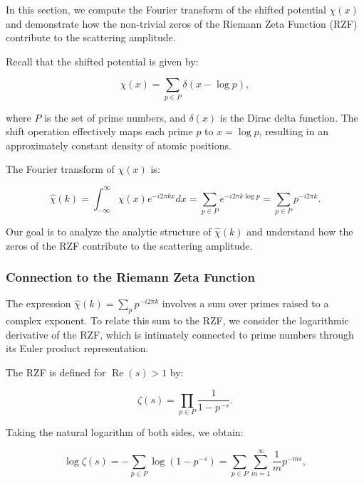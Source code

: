 \documentclass[11pt, oneside]{article}
\begin{document}
In this section, we compute the Fourier transform of the shifted potential $\chi(x)$ and demonstrate how the non-trivial zeros of the Riemann Zeta Function (RZF) contribute to the scattering amplitude.

Recall that the shifted potential is given by:

\begin{equation}
\chi(x) = \sum_{p \in P} \delta\left(x - \log p\right),
\end{equation}

where $P$ is the set of prime numbers, and $\delta(x)$ is the Dirac delta function. The shift operation effectively maps each prime $p$ to $x = \log p$, resulting in an approximately constant density of atomic positions.

The Fourier transform of $\chi(x)$ is:

\begin{equation}
\hat{\chi}(k) = \int_{-\infty}^{\infty} \chi(x) e^{-i 2\pi k x} dx = \sum_{p \in P} e^{-i 2\pi k \log p} = \sum_{p \in P} p^{-i 2\pi k}.
\end{equation}

Our goal is to analyze the analytic structure of $\hat{\chi}(k)$ and understand how the zeros of the RZF contribute to the scattering amplitude.

\subsubsection{Connection to the Riemann Zeta Function}

The expression $\hat{\chi}(k) = \sum_{p} p^{-i 2\pi k}$ involves a sum over primes raised to a complex exponent. To relate this sum to the RZF, we consider the logarithmic derivative of the RZF, which is intimately connected to prime numbers through its Euler product representation.

The RZF is defined for $\operatorname{Re}(s) > 1$ by:

\begin{equation}
\zeta(s) = \prod_{p \in P} \frac{1}{1 - p^{-s}}.
\end{equation}

Taking the natural logarithm of both sides, we obtain:

\begin{equation}
\log \zeta(s) = -\sum_{p \in P} \log\left(1 - p^{-s}\right) = \sum_{p \in P} \sum_{m=1}^\infty \frac{1}{m} p^{-m s},
\end{equation}
\end{document}
